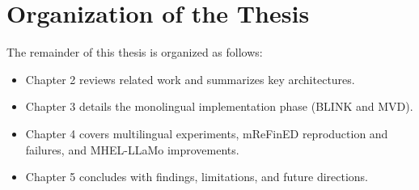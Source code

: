 \section{Organization of the Thesis}
The remainder of this thesis is organized as follows:
\begin{itemize}
    \item Chapter 2 reviews related work and summarizes key architectures.
    \item Chapter 3 details the monolingual implementation phase (BLINK and MVD).
    \item Chapter 4 covers multilingual experiments, mReFinED reproduction and failures, and MHEL-LLaMo improvements.
    \item Chapter 5 concludes with findings, limitations, and future directions.
\end{itemize}
